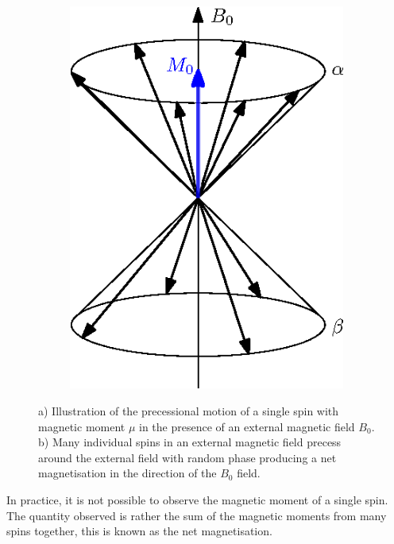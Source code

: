 \begin{figure}
\begin{subfigure}{0.3\textwidth}
		\includegraphics[width = \textwidth]{figures/background/manyspins.eps}
		\caption{}
		\label{fig:manyspins}
	\end{subfigure}
	
	\caption[Illustration of the precessional motion of a single spin and production of magnetisation by many spins]{a) Illustration of the precessional motion of a single spin with magnetic moment $\mu$ in the presence of an external magnetic field $B_0$. b) Many individual spins in an external magnetic field precess around the external field with random phase producing a net magnetisation in the direction of the $B_0$ field.}
	\label{fig:precession-spins}
	
\end{figure}


In practice, it is not possible to observe the magnetic moment of a single spin. 
The quantity observed is rather the sum of the magnetic moments from many spins together, this is known as the net magnetisation. 

